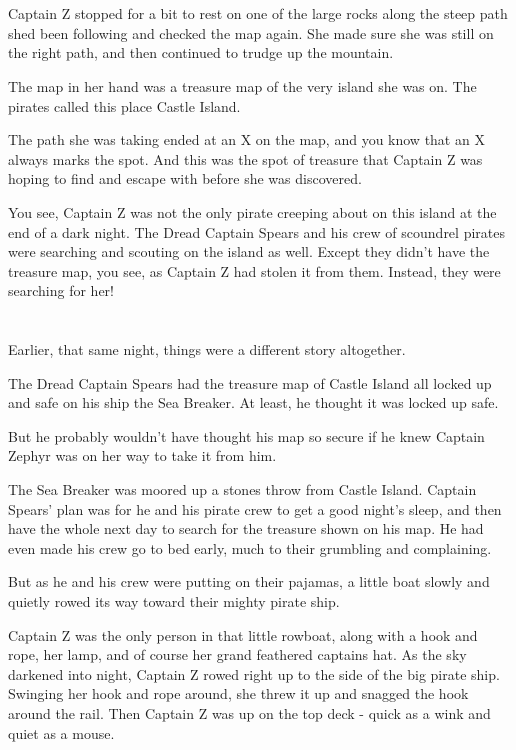 \documentclass[12pt]{extbook}
\begin{document}
  \section{}\label{section-1}
  
  Captain Z stopped for a bit to rest on one of the large rocks along the
  steep path shed been following and checked the map again. She made sure
  she was still on the right path, and then continued to trudge up the
  mountain.
  
  The map in her hand was a treasure map of the very island she was on.
  The pirates called this place Castle Island.
  
  The path she was taking ended at an X on the map, and you know that an X
  always marks the spot. And this was the spot of treasure that Captain Z
  was hoping to find and escape with before she was discovered.
  
  You see, Captain Z was not the only pirate creeping about on this island
  at the end of a dark night. The Dread Captain Spears and his crew of
  scoundrel pirates were searching and scouting on the island as well.
  Except they didn't have the treasure map, you see, as Captain Z had
  stolen it from them. Instead, they were searching for her!
  
  \section{}\label{section-2}
  
  Earlier, that same night, things were a different story altogether.
  
  The Dread Captain Spears had the treasure map of Castle Island all
  locked up and safe on his ship the Sea Breaker. At least, he thought it
  was locked up safe.
  
  But he probably wouldn't have thought his map so secure if he knew
  Captain Zephyr was on her way to take it from him.
  
  The Sea Breaker was moored up a stones throw from Castle Island. Captain
  Spears' plan was for he and his pirate crew to get a good night's sleep,
  and then have the whole next day to search for the treasure shown on his
  map. He had even made his crew go to bed early, much to their grumbling
  and complaining.
  
  But as he and his crew were putting on their pajamas, a little boat
  slowly and quietly rowed its way toward their mighty pirate ship.
  
  Captain Z was the only person in that little rowboat, along with a hook
  and rope, her lamp, and of course her grand feathered captains hat. As
  the sky darkened into night, Captain Z rowed right up to the side of the
  big pirate ship. Swinging her hook and rope around, she threw it up and
  snagged the hook around the rail. Then Captain Z was up on the top deck
  - quick as a wink and quiet as a mouse.
  
\end{document}
